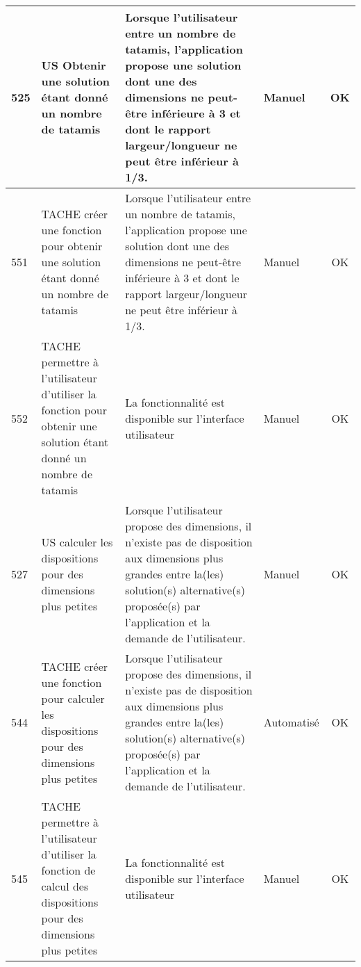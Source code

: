 \begin{adjustwidth}{-1.5cm}{0cm}
{\begin{tabular}{|m{0.6cm}|m{5.5cm}|m{8cm}|m{2cm}|c|}
            525 & US Obtenir une solution étant donné un nombre de tatamis                                                           & Lorsque l'utilisateur entre un nombre de tatamis, l'application propose une solution dont une des dimensions ne peut-être inférieure à 3 et dont le rapport largeur/longueur ne peut être inférieur à 1/3.& Manuel          & OK       \\ \hline
            551 & TACHE créer une fonction pour obtenir une solution étant donné un nombre de tatamis                                & Lorsque l'utilisateur entre un nombre de tatamis, l'application propose une solution dont une des dimensions ne peut-être inférieure à 3 et dont le rapport largeur/longueur ne peut être inférieur à 1/3.                         & Manuel          & OK       \\ \hline
            552 & TACHE permettre à l'utilisateur d'utiliser la fonction pour obtenir une solution étant donné un nombre de tatamis  & \cellcolor{tsgrey}La fonctionnalité est disponible sur l'interface utilisateur                                                                                                                                                                       & Manuel          & OK       \\ \hline
            527 & US calculer les dispositions pour des dimensions plus petites                                                      & \cellcolor{tsgrey} Lorsque l'utilisateur propose des dimensions, il n'existe pas de disposition aux dimensions plus grandes entre la(les) solution(s) alternative(s) proposée(s) par l'application et la demande de l'utilisateur. & Manuel          & OK       \\ \hline
            544 & TACHE créer une fonction pour calculer les dispositions pour des dimensions plus petites                           & Lorsque l'utilisateur propose des dimensions, il n'existe pas de disposition aux dimensions plus grandes entre la(les) solution(s) alternative(s) proposée(s) par l'application et la demande de l'utilisateur.                    & Automatisé      & OK       \\ \hline
            545 & TACHE permettre à l'utilisateur d'utiliser la fonction de calcul des dispositions pour des dimensions plus petites & \cellcolor{tsgrey}La fonctionnalité est disponible sur l'interface utilisateur                                                                                                                                                                       & Manuel          & OK       \\ \hline
                   \end{tabular}}
\end{adjustwidth}

